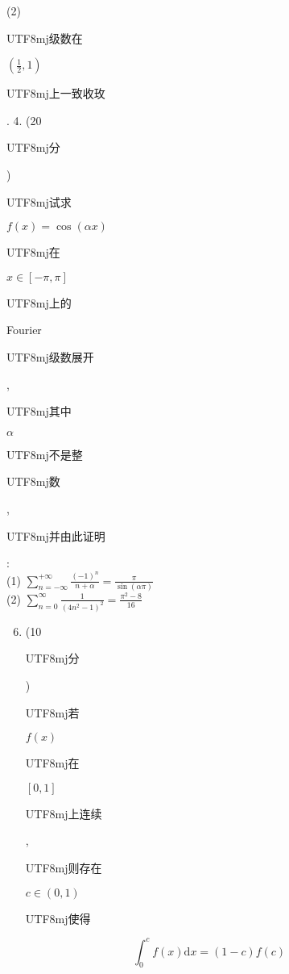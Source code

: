 \documentclass[10pt]{article}
\begin{document}
(2) \begin{CJK}{UTF8}{mj}级数在\end{CJK} $\left(\frac{1}{2}, 1\right)$ \begin{CJK}{UTF8}{mj}上一致收玫\end{CJK}. 4. (20 \begin{CJK}{UTF8}{mj}分\end{CJK}) \begin{CJK}{UTF8}{mj}试求\end{CJK} $f(x)=\cos (\alpha x)$ \begin{CJK}{UTF8}{mj}在\end{CJK} $x \in[-\pi, \pi]$ \begin{CJK}{UTF8}{mj}上的\end{CJK} Fourier \begin{CJK}{UTF8}{mj}级数展开\end{CJK}, \begin{CJK}{UTF8}{mj}其中\end{CJK} $\alpha$ \begin{CJK}{UTF8}{mj}不是整\end{CJK} \begin{CJK}{UTF8}{mj}数\end{CJK}, \begin{CJK}{UTF8}{mj}并由此证明\end{CJK}:\\
(1) $\sum_{n=-\infty}^{+\infty} \frac{(-1)^{n}}{n+\alpha}=\frac{\pi}{\sin (\alpha \pi)}$\\
(2) $\sum_{n=0}^{\infty} \frac{1}{\left(4 n^{2}-1\right)^{2}}=\frac{\pi^{2}-8}{16}$

\begin{enumerate}
  \setcounter{enumi}{5}
  \item (10 \begin{CJK}{UTF8}{mj}分\end{CJK}) \begin{CJK}{UTF8}{mj}若\end{CJK} $f(x)$ \begin{CJK}{UTF8}{mj}在\end{CJK} $[0,1]$ \begin{CJK}{UTF8}{mj}上连续\end{CJK}, \begin{CJK}{UTF8}{mj}则存在\end{CJK} $c \in(0,1)$ \begin{CJK}{UTF8}{mj}使得\end{CJK}
\end{enumerate}
$$
\int_{0}^{c} f(x) \mathrm{d} x=(1-c) f(c)
$$
\end{document}
